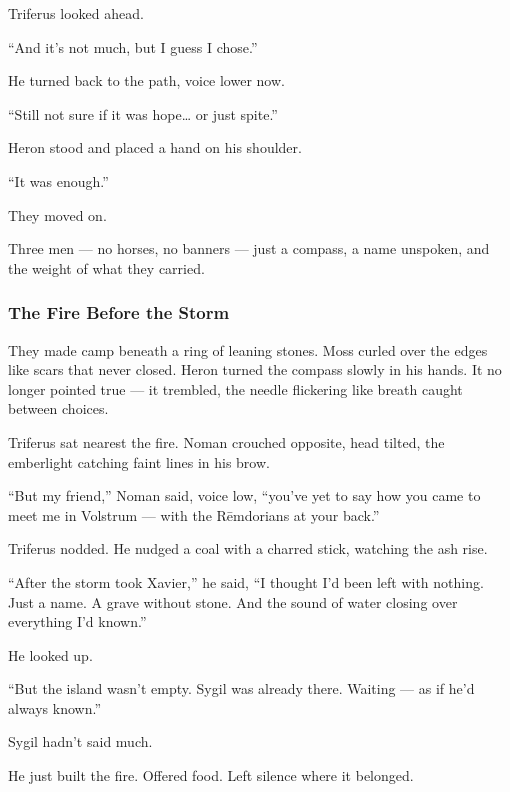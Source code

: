 \documentclass[12pt]{article}
\begin{document}
Triferus looked ahead.

“And it's not much, but I guess I chose.”

He turned back to the path, voice lower now.

“Still not sure if it was hope… or just spite.”

\vspace{1em}

Heron stood and placed a hand on his shoulder.

“It was enough.”

\vspace{1em}

They moved on.

Three men — no horses, no banners — just a compass, a name unspoken, and the weight of what they carried.

\dotfill

\subsubsection*{The Fire Before the Storm}
They made camp beneath a ring of leaning stones. Moss curled over the edges like scars that never closed. Heron turned the compass slowly in his hands. It no longer pointed true — it trembled, the needle flickering like breath caught between choices.

Triferus sat nearest the fire. Noman crouched opposite, head tilted, the emberlight catching faint lines in his brow.

“But my friend,” Noman said, voice low, “you’ve yet to say how you came to meet me in Volstrum — with the Rēmdorians at your back.”

\vspace{1em}

Triferus nodded. He nudged a coal with a charred stick, watching the ash rise.

“After the storm took Xavier,” he said, “I thought I’d been left with nothing. Just a name. A grave without stone. And the sound of water closing over everything I’d known.”

He looked up.

“But the island wasn’t empty. Sygil was already there. Waiting — as if he’d always known.”

\vspace{1em}

Sygil hadn’t said much.

He just built the fire. Offered food. Left silence where it belonged.
\end{document}
